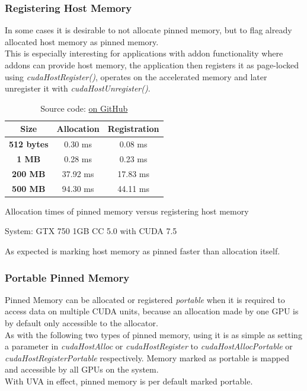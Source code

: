 \subsubsection{Registering Host Memory}
In some cases it is desirable to not allocate pinned memory, but to flag already allocated host memory as pinned memory.\\
This is especially interesting for applications with addon functionality where addons can provide host memory,
the application then registers it as page-locked using \emph{cudaHostRegister()}, operates on the accelerated memory and later unregister it with \emph{cudaHostUnregister()}.\\
\begin{table}
\centering
\begin{tabular}{c|c|c}
    \textbf{Size} & \textbf{Allocation} & \textbf{Registration}\\
\hline
\textbf{512 bytes} & 0.30 ms  & 0.08 ms\\
\textbf{1 MB}      & 0.28 ms  & 0.23 ms\\
\textbf{200 MB}    & 37.92 ms & 17.83 ms\\
\textbf{500 MB}    & 94.30 ms & 44.11 ms\\
\hline
\end{tabular}
\caption{Allocation times of pinned memory versus registering host memory}
\caption{System: GTX 750 1GB CC 5.0 with CUDA 7.5}
\caption{Source code: \href{https://github.com/spotlight0xff/cuda\_paper/code/alloc/}{on GitHub}}
\label{tab:host_reg_pinned}
\end{table}
As expected is marking host memory as pinned faster than allocation itself.\\
\subsubsection{Portable Pinned Memory}
Pinned Memory can be allocated or registered \emph{portable}  when it is required to access data on multiple CUDA units,
because an allocation made by one GPU is by default only accessible to the allocator.\\
As with the following two types of pinned memory, using it is as simple as setting a parameter in
\emph{cudaHostAlloc} or \emph{cudaHostRegister} to \emph{cudaHostAllocPortable} or \emph{cudaHostRegisterPortable} respectively.
Memory marked as portable is mapped and accessible by all GPUs on the system.\\
With UVA in effect, pinned memory is per default marked portable.
